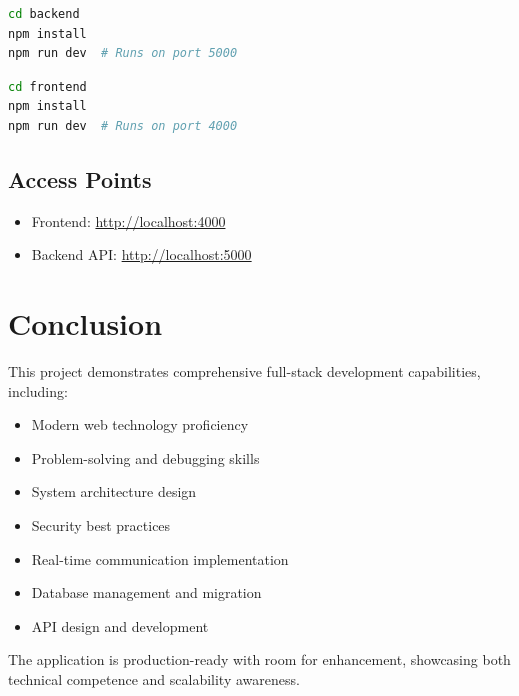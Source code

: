 \documentclass[11pt,a4paper]{article}
\begin{document}
\begin{lstlisting}[language=bash, caption=Backend Setup]
cd backend
npm install
npm run dev  # Runs on port 5000
\end{lstlisting}

\begin{lstlisting}[language=bash, caption=Frontend Setup]
cd frontend
npm install
npm run dev  # Runs on port 4000
\end{lstlisting}

\subsection{Access Points}
\begin{itemize}[leftmargin=*]
    \item Frontend: \url{http://localhost:4000}
    \item Backend API: \url{http://localhost:5000}
\end{itemize}

\section{Conclusion}

This project demonstrates comprehensive full-stack development capabilities, including:

\begin{itemize}[leftmargin=*]
    \item Modern web technology proficiency
    \item Problem-solving and debugging skills
    \item System architecture design
    \item Security best practices
    \item Real-time communication implementation
    \item Database management and migration
    \item API design and development
\end{itemize}

The application is production-ready with room for enhancement, showcasing both technical competence and scalability awareness.
\end{document}

